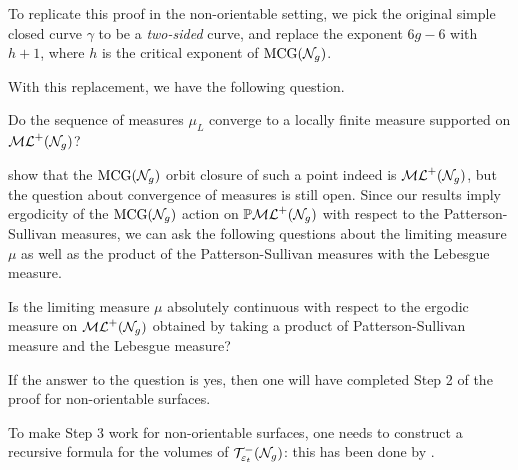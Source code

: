 To replicate this proof in the non-orientable setting, we pick the original simple closed curve $\gamma$ to be a \emph{two-sided} curve, and replace the exponent $6g-6$ with $h + 1$, where $h$ is the critical exponent of $\mathrm{MCG}(\mathcal{N}_g)$.

With this replacement, we have the following question.
\begin{question}
  Do the sequence of measures $\mu_L$ converge to a locally finite measure supported on $\mathcal{ML}^+(\mathcal{N}_g)$?
\end{question}

\textcite{erlandsson2023mapping} show that the $\mathrm{MCG}(\mathcal{N}_g)$ orbit closure of such a point indeed is $\mathcal{ML}^+(\mathcal{N}_g)$, but the question about convergence of measures is still open.
Since our results imply ergodicity of the $\mathrm{MCG}(\mathcal{N}_g)$ action on $\mathbb{P}\mathcal{ML}^+(\mathcal{N}_g)$ with respect to the Patterson-Sullivan measures, we can ask the following questions about the limiting measure $\mu$ as well as the product of the Patterson-Sullivan measures with the Lebesgue measure.

\begin{question}
  Is the limiting measure $\mu$ absolutely continuous with respect to the ergodic measure on $\mathcal{ML}^+(\mathcal{N}_g)$ obtained by taking a product of Patterson-Sullivan measure and the Lebesgue measure?
\end{question}
If the answer to the question is yes, then one will have completed Step 2 of the proof for non-orientable surfaces.

To make Step 3 work for non-orientable surfaces, one needs to construct a recursive formula for the volumes of $\mathcal{T}_{\varepsilon_t}^{-}(\mathcal{N}_g)$: this has been done by \textcite{stanford2023mirzakhani}.

